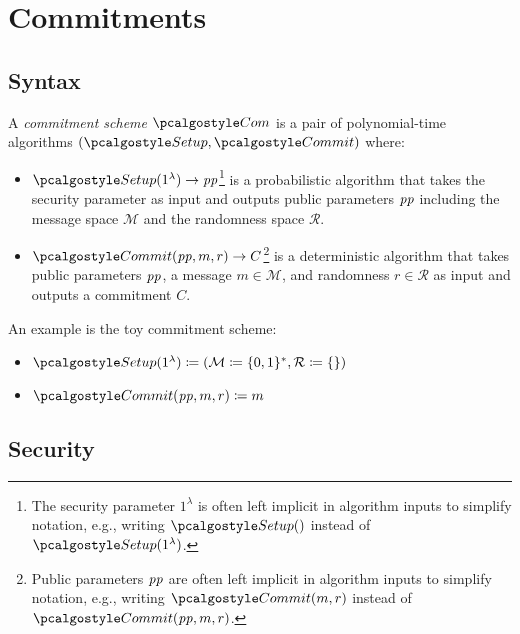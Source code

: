 \section{Commitments}\label{sec:commitments}

\subsection{Syntax}
\begin{definition}
  A \emph{commitment scheme} $\algo{Com}$ is a pair of polynomial-time algorithms $(\algo{Setup}, \algo{Commit})$ where:
  \begin{itemize}
    \item $\algo{Setup}(1^\lambda) \rightarrow \params$\footnote{The security parameter $1^\lambda$ is often left implicit in algorithm inputs to simplify notation, e.g., writing $\algo{Setup}()$ instead of $\algo{Setup}(1^\lambda)$.} is a probabilistic algorithm that takes the security parameter as input and outputs public parameters $\mathit{pp}$ including the message space $\mathcal{M}$ and the randomness space $\mathcal{R}$.
    \item $\algo{Commit}(\params, m, r) \rightarrow C$\footnote{Public parameters $\mathit{pp}$ are often left implicit in algorithm inputs to simplify notation, e.g., writing $\algo{Commit}(m, r)$ instead of $\algo{Commit}(\params, m, r)$.} is a deterministic algorithm that takes public parameters $\mathit{pp}$, a message $m \in \mathcal{M}$, and randomness $r \in \mathcal{R}$ as input and outputs a commitment $C$.
  \end{itemize}
\end{definition}

\begin{example}
  An example is the toy commitment scheme\label{sec:toy-com}:
  \begin{itemize}
    \item $\algo{Setup}(1^\lambda) \defeq (\mathcal{M} \defeq \{0, 1\}^*, \mathcal{R} \defeq \{\})$
    \item $\algo{Commit}(\params, m, r) \defeq m$
  \end{itemize}
\end{example}

\subsection{Security}

